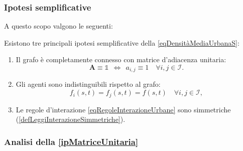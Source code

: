             \subsubsection{Ipotesi semplificative}

                A questo scopo valgono le seguenti:

                \begin{ipo}
                    Esistono tre principali ipotesi semplificative della \ref{eqDensitàMediaUrbanaS}:

                    \begin{enumerate}[
                        label=S\arabic*,
                    ]
                        \item\label{ipMatriceUnitaria} Il grafo è completamente connesso con matrice d'adiacenza unitaria:
                            \[
                                \mathbf A\equiv\mathbb1
                                \ \ \iff\ \ 
                                a_{i,j}\equiv1
                                \quad\forall i,j\in\mathcal I.
                            \]
                        \item\label{ipAgentiIndistinguibili} Gli agenti sono indistinguibili rispetto al grafo:
                            \[
                                f_i(s,t)=f_j(s,t)=f(s,t)
                                \quad\forall i,j\in\mathcal I,
                            \]
                        \item\label{ipInterazioniSimmetriche} Le regole d'interazione \ref{eqRegoleInterazioneUrbane} sono simmetriche (\cref{defLeggiInterazioneSimmetriche}).
                    \end{enumerate}
                \end{ipo}

            \subsubsection{Analisi della \texorpdfstring{\ref{ipMatriceUnitaria}}{S1}}

